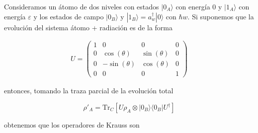 \documentclass[12pt]{article}
\makeatletter
\theoremstyle{definition}\@ifundefined{exercise}{\newtheorem{exercise}{Ejercicio}}{}%
\makeatother
\begin{document}
\begin{exercise}
    Consideramos un átomo de dos niveles con estados $|0_A\rangle$ con energía 0 y $|1_A\rangle$ con energía $\varepsilon$ y los estados de campo $|0_B\rangle$ y $|1_B\rangle=a^\dagger_w|0\rangle$ con $\hbar w$. Si suponemos que la evolución del sistema átomo + radiación es de la forma

\begin{align*}
    U = \begin{pmatrix*}
                1 & 0 & 0 & 0 \\
    0 & \cos(\theta) & \sin(\theta) & 0 \\
    0 & -\sin(\theta) & \cos(\theta) & 0 \\ 
    0 & 0 & 0 & 1       
    \end{pmatrix*}
\end{align*}

entonces, tomando la traza parcial de la evolución total

$$\rho'_A=\text{Tr}_C[U\rho_{A}\otimes |0_B\rangle\langle 0_B|U^\dagger]$$ 

obtenemos que los operadores de Krauss son

\end{exercise}
\end{document}
